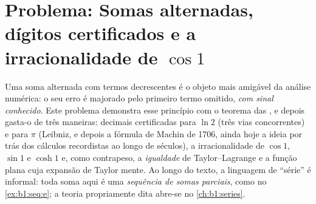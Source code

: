 \section{Problema: Somas alternadas, dígitos certificados e a
irracionalidade de $\cos 1$}

\begin{problem}
\label{pb:b1:taylor:1}
Uma soma alternada com termos decrescentes é o objeto mais amigável da
análise numérica: o seu erro é majorado pelo primeiro termo omitido,
\emph{com sinal conhecido}. Este problema demonstra esse princípio com
o teorema das , e depois gasta-o de três
maneiras: decimais certificadas para $\ln 2$ (três vias concorrentes) e
para $\pi$ (Leibniz, e depois a fórmula de Machin de 1706, ainda hoje a
ideia por trás dos cálculos recordistas ao longo de séculos), a
irracionalidade de $\cos 1$, $\sin 1$ e $\cosh 1$ e, como contrapeso, a
\emph{igualdade} de Taylor--Lagrange e a função plana cuja expansão de
Taylor mente. Ao longo do texto,
a linguagem de ``série'' é informal: toda soma aqui é uma
\emph{sequência de somas parciais}, como no \cref{ex:b1:seq:e}; a teoria
propriamente dita abre-se no \cref{ch:b1:series}.


\end{problem}
